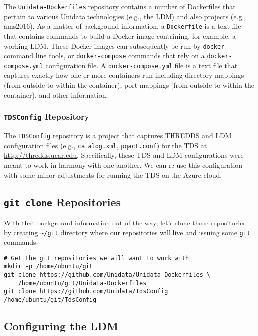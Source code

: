 \documentclass{article}
\begin{document}
The \texttt{Unidata-Dockerfiles} repository contains a number of Dockerfiles that pertain to various Unidata technologies (e.g., the LDM) and also projects (e.g., ams2016). As a matter of background information, a \texttt{Dockerfile} is a text file that contains commands to build a Docker image containing, for example, a working LDM. These Docker images can subsequently be run by \texttt{docker} command line tools, or \texttt{docker-compose} commands that rely on a \texttt{docker-compose.yml} configuration file. A \texttt{docker-compose.yml} file is a text file that captures exactly how one or more containers run including directory mappings (from outside to within the container), port mappings (from outside to within the container), and other information.

\subsubsection{\texttt{TDSConfig} Repository}
\label{sec:orgheadline14}

The \texttt{TDSConfig} repository is a project that captures THREDDS and LDM configuration files (e.g., \texttt{catalog.xml}, \texttt{pqact.conf}) for the TDS at \url{http://thredds.ucar.edu}. Specifically, these TDS and LDM configurations were meant to work in harmony with one another. We can re-use this configuration with some minor adjustments for running the TDS on the Azure cloud.

\subsection{\texttt{git clone} Repositories}
\label{sec:orgheadline16}

With that background information out of the way, let's clone those repositories by creating \texttt{\textasciitilde{}/git} directory where our repositories will live and issuing some \texttt{git} commands.

\begin{verbatim}
# Get the git repositories we will want to work with
mkdir -p /home/ubuntu/git
git clone https://github.com/Unidata/Unidata-Dockerfiles \
    /home/ubuntu/git/Unidata-Dockerfiles
git clone https://github.com/Unidata/TdsConfig /home/ubuntu/git/TdsConfig
\end{verbatim}

\subsection{Configuring the LDM}
\label{sec:orgheadline25}
\end{document}
